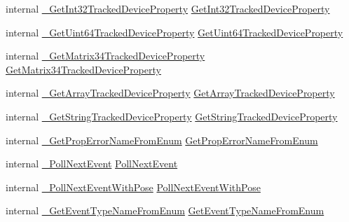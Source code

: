 \begin{DoxyCompactItemize}
internal \mbox{\hyperlink{struct_valve_1_1_v_r_1_1_i_v_r_system_a0201a1804a9833cfe2834c810ee97893}{\+\_\+\+Get\+Int32\+Tracked\+Device\+Property}} \mbox{\hyperlink{struct_valve_1_1_v_r_1_1_i_v_r_system_ad2b2ee545a313585fffd1971cd1be4bf}{Get\+Int32\+Tracked\+Device\+Property}}
\item 
internal \mbox{\hyperlink{struct_valve_1_1_v_r_1_1_i_v_r_system_a2cd6c3c2bdb9cbf7ee06115283aa3640}{\+\_\+\+Get\+Uint64\+Tracked\+Device\+Property}} \mbox{\hyperlink{struct_valve_1_1_v_r_1_1_i_v_r_system_a3ba664ad5c9d2b52d4c5f9c7917308f5}{Get\+Uint64\+Tracked\+Device\+Property}}
\item 
internal \mbox{\hyperlink{struct_valve_1_1_v_r_1_1_i_v_r_system_add3a6aac11e39d31852a68b40434aa72}{\+\_\+\+Get\+Matrix34\+Tracked\+Device\+Property}} \mbox{\hyperlink{struct_valve_1_1_v_r_1_1_i_v_r_system_a995ec67fd90726b954f37ca8a0f941ea}{Get\+Matrix34\+Tracked\+Device\+Property}}
\item 
internal \mbox{\hyperlink{struct_valve_1_1_v_r_1_1_i_v_r_system_a664650bb051f15b2aa5974a22fb4f483}{\+\_\+\+Get\+Array\+Tracked\+Device\+Property}} \mbox{\hyperlink{struct_valve_1_1_v_r_1_1_i_v_r_system_a8794f5d4fdd98afbaf5f0b60f78b841a}{Get\+Array\+Tracked\+Device\+Property}}
\item 
internal \mbox{\hyperlink{struct_valve_1_1_v_r_1_1_i_v_r_system_a6dec2a7ad8cb675cbc12248da723827b}{\+\_\+\+Get\+String\+Tracked\+Device\+Property}} \mbox{\hyperlink{struct_valve_1_1_v_r_1_1_i_v_r_system_a333164a121dcf6dd2496d237c2476784}{Get\+String\+Tracked\+Device\+Property}}
\item 
internal \mbox{\hyperlink{struct_valve_1_1_v_r_1_1_i_v_r_system_ab8df6803ff20af23449bb3a8951f75f8}{\+\_\+\+Get\+Prop\+Error\+Name\+From\+Enum}} \mbox{\hyperlink{struct_valve_1_1_v_r_1_1_i_v_r_system_a0456c00bd2ce6efef6e542ac99b933b4}{Get\+Prop\+Error\+Name\+From\+Enum}}
\item 
internal \mbox{\hyperlink{struct_valve_1_1_v_r_1_1_i_v_r_system_ad05dee46b825b66c941f09a69ddc2a13}{\+\_\+\+Poll\+Next\+Event}} \mbox{\hyperlink{struct_valve_1_1_v_r_1_1_i_v_r_system_a77dd68df65c7feb90c6bb81aeb49790c}{Poll\+Next\+Event}}
\item 
internal \mbox{\hyperlink{struct_valve_1_1_v_r_1_1_i_v_r_system_a651836066c8780d5e5aadab482bd22d3}{\+\_\+\+Poll\+Next\+Event\+With\+Pose}} \mbox{\hyperlink{struct_valve_1_1_v_r_1_1_i_v_r_system_a1d29adecbeff4cc37b4e30f83d74efa2}{Poll\+Next\+Event\+With\+Pose}}
\item 
internal \mbox{\hyperlink{struct_valve_1_1_v_r_1_1_i_v_r_system_a31f48cf54b258ae76bcfc5444ee883c8}{\+\_\+\+Get\+Event\+Type\+Name\+From\+Enum}} \mbox{\hyperlink{struct_valve_1_1_v_r_1_1_i_v_r_system_aeff0e53b53082e6fd51aa033513cabbf}{Get\+Event\+Type\+Name\+From\+Enum}}

\end{DoxyCompactItemize}

